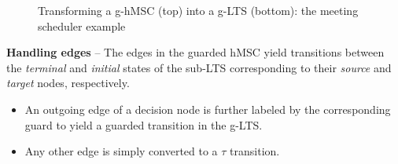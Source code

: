 \begin{figure}[H]
\centering
{}
\caption{Transforming a g-hMSC (top) into a g-LTS (bottom): the meeting scheduler example\label{image:scheduler-ghmsc-glts}}
\end{figure}

\noindent \textbf{Handling edges} -- The edges in the guarded hMSC yield transitions between the \emph{terminal} and \emph{initial} states of the sub-LTS corresponding to their \emph{source} and \emph{target} nodes, respectively.
\begin{itemize}
\item An outgoing edge of a decision node is further labeled by the corresponding guard to yield a guarded transition in the g-LTS.
\item Any other edge is simply converted to a $\tau$ transition.
\end{itemize}

